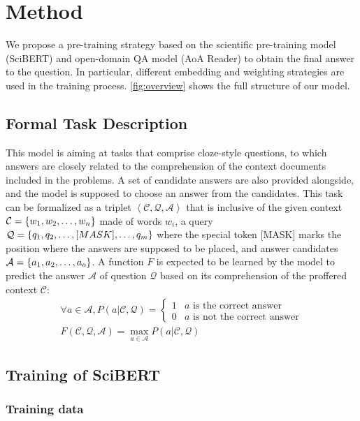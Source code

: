 \documentclass[sigconf, screen]{acmart}
\newcommand{\scibert}{Sci\-BERT\xspace}
\newcommand{\aoa}{AoA Reader\xspace}
\begin{document}
\section{Method}
We propose a pre-training strategy based on the scientific pre-training model (\scibert) and open-domain QA model (\aoa ) to obtain the final answer to the question. In particular, different embedding and weighting strategies are used in the training process. \cref{fig:overview} shows the full structure of our model.

\subsection{Formal Task Description}
This model is aiming at tasks that comprise cloze-style questions, to which answers are closely related to the comprehension of the context documents included in the problems. A set of candidate answers are also provided alongside, and the model is supposed to choose an answer from the candidates. This task can be formalized as a triplet $\left\langle \mathcal{C}, \mathcal{Q}, \mathcal{A} \right\rangle$ that is inclusive of the given context $\mathcal{C} = \{w_1, w_2, \dots, w_n\}$ made of words $w_i$, a query $\mathcal{Q} = \{q_1, q_2, \dots, [MASK] , \dots, q_m\}$ where the special token [MASK] marks the position where the answers are supposed to be placed, and answer candidates $\mathcal{A} = \{a_1, a_2, \dots, a_o\}$. A function $F$ is expected to be learned by the model to predict the answer $\mathcal{A}$ of question $\mathcal{Q}$ based on its comprehension of the proffered context $\mathcal{C}$:
\begin{gather}
    \forall a \in \mathcal{A}, P(a|\mathcal{C}, \mathcal{Q}) = \begin{cases}
        1 & a \text{ is the correct answer} \\
        0 & a \text{ is not the correct answer}
    \end{cases} \\
    F(\mathcal{C}, \mathcal{Q}, \mathcal{A}) = \max_{a \in \mathcal{A}} P(a|\mathcal{C}, \mathcal{Q})
\end{gather}

\subsection{Training of \scibert}

\subsubsection{Training data}
\end{document}
